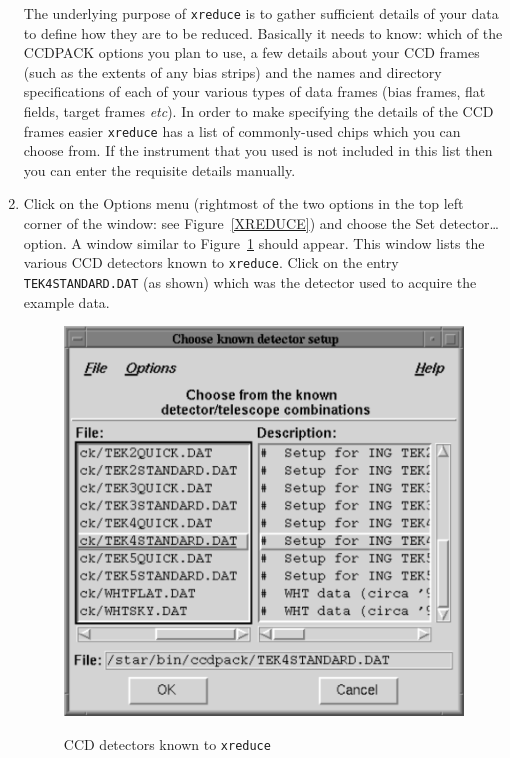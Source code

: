 \documentclass[twoside,11pt]{starlink}
\begin{document}
\begin{enumerate}
   The underlying purpose of \texttt{xreduce} is to gather sufficient details
   of your data to define how they are to be reduced.  Basically it needs
   to know: which of the CCDPACK options you plan to use, a few details
   about your CCD frames (such as the extents of any bias strips) and the
   names and directory specifications of each of your various types of
   data frames (bias frames, flat fields, target frames \emph{etc}).  In
   order to make specifying the details of the CCD frames easier \texttt{xreduce} has a list of commonly-used chips which you can choose from.
   If the instrument that you used is not included in this list then you
   can enter the requisite details manually.

  \item Click on the \textsf{Options} menu (rightmost of the two options in
   the top left corner of the window: see Figure~\ref{XREDUCE}) and
   choose the \textsf{Set detector\ldots} option.  A window similar to
   Figure~\ref{SETDETECTOR} should appear.  This window lists the various
   CCD detectors known to \texttt{xreduce}.  Click on the entry \texttt{TEK4STANDARD.DAT} (as shown) which was the detector used to acquire the
   example data.

  \begin{figure}[htbp]
     \centering
      \includegraphics[totalheight=3in]{sc5_setdetector}
      \begin{quote}
      \caption{CCD detectors known to \texttt{xreduce}
      \label{SETDETECTOR} }
      \end{quote}
  \end{figure}


\end{enumerate}
\end{document}
